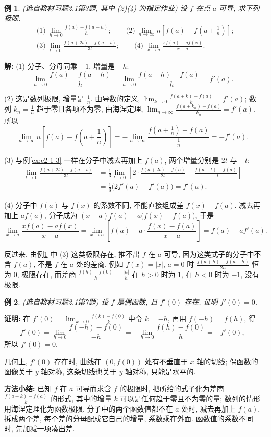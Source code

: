 \documentclass[UTF8,openany]{ctexbook}
\theoremstyle{chinesetextbook}
\newtheorem{example}{例}[section]
\newenvironment{cnproof}{\par\indent\textbf{证明:} \ignorespaces}{\par}
\newenvironment{cnsolution}{\par\indent\textbf{解:} \ignorespaces}{\par}
\begin{document}
\begin{example}\label{ex:c2-h1-3}
\textnormal{(选自教材习题2.1第3题, 其中 (2)(4) 为指定作业)} 设 $f$ 在点 $a$ 可导, 求下列极限:
\[
\begin{aligned}
&\text{(1)}\ \lim_{h\to0}\frac{f(a)-f(a-h)}h;\qquad\text{(2)}\ \lim_{n\to\infty}n\left[f(a)-f\left(a+\frac1n\right)\right];\\
&\text{(3)}\ \lim_{t\to0}\frac{f(a+2t)-f(a-t)}{3t};\qquad\text{(4)}\ \lim_{x\to a}\frac{xf(a)-af(x)}{x-a}.
\end{aligned}
\]
\end{example}
\begin{cnsolution}
(1) 分子、分母同乘 $-1$, 增量是 $-h$:
\[
\lim_{h\to0}\frac{f(a)-f(a-h)}h=\lim_{h\to0}\frac{f(a-h)-f(a)}{-h}=f'(a).
\]

(2) 这是数列极限, 增量是 $\displaystyle\frac1n$. 由导数的定义, $\displaystyle\lim_{k\to0}\frac{f(a+k)-f(a)}k=f'(a)$; 数列 $\displaystyle k_n=\frac1n$ 趋于零且各项不为零, 由海涅定理, $\displaystyle\lim_{n\to\infty}\frac{f(a+k_n)-f(a)}{k_n}=f'(a)$. 所以
\[
\lim_{n\to\infty}n\left[f(a)-f\left(a+\frac1n\right)\right]=-\lim_{n\to\infty}\frac{f\left(a+\frac1n\right)-f(a)}{\frac1n}=-f'(a).
\]

(3) 与例\ref{ex:c2-1-3} 一样在分子中减去再加上 $f(a)$, 两个增量分别是 $2t$ 与 $-t$:
\[
\begin{aligned}
\lim_{t\to0}\frac{f(a+2t)-f(a-t)}{3t}&=\frac13\lim_{t\to0}\left[2\cdot\frac{f(a+2t)-f(a)}{2t}+\frac{f(a-t)-f(a)}{-t}\right]\\
&=\frac13\bigl(2f'(a)+f'(a)\bigr)=f'(a).
\end{aligned}
\]

(4) 分子中 $f(a)$ 与 $f(x)$ 的系数不同, 不能直接组成差 $f(x)-f(a)$. 减去再加上 $af(a)$, 分子成为 $(x-a)f(a)-a\bigl(f(x)-f(a)\bigr)$, 于是
\[
\lim_{x\to a}\frac{xf(a)-af(x)}{x-a}=\lim_{x\to a}\left[f(a)-a\cdot\frac{f(x)-f(a)}{x-a}\right]=f(a)-af'(a).
\]
\end{cnsolution}
反过来, 由例\ref{ex:c2-h1-3} 中 (3) 这类极限存在, 推不出 $f$ 在 $a$ 可导, 因为这类式子的分子中不含 $f(a)$, 不是 $f$ 在 $a$ 处的差商. 例如 $f(x)=|x|$, $a=0$ 时 $\displaystyle\frac{f(a+h)-f(a-h)}{2h}$ 恒为 $0$, 极限存在, 而差商 $\displaystyle\frac{f(h)-f(0)}h=\frac{|h|}h$ 在 $h>0$ 时为 $1$, 在 $h<0$ 时为 $-1$, 没有极限.
\begin{example}\label{ex:c2-h1-7}
\textnormal{(选自教材习题2.1第7题)} 设 $f$ 是偶函数, 且 $f'(0)$ 存在. 证明 $f'(0)=0$.
\end{example}
\begin{cnproof}
在 $\displaystyle f'(0)=\lim_{k\to0}\frac{f(k)-f(0)}k$ 中令 $k=-h$, 再用 $f(-h)=f(h)$, 得
\[
f'(0)=\lim_{h\to0}\frac{f(-h)-f(0)}{-h}=-\lim_{h\to0}\frac{f(h)-f(0)}h=-f'(0),
\]
所以 $f'(0)=0$.
\end{cnproof}
几何上, $f'(0)$ 存在时, 曲线在 $(0,f(0))$ 处有不垂直于 $x$ 轴的切线; 偶函数的图像关于 $y$ 轴对称, 这条切线也关于 $y$ 轴对称, 只能是水平的.
\par\indent\textbf{方法小结:} 已知 $f$ 在 $a$ 可导而求含 $f$ 的极限时, 把所给的式子化为差商 $\displaystyle\frac{f(a+k)-f(a)}k$ 的形式, 其中的增量 $k$ 可以是任何趋于零且不为零的量; 数列的情形用海涅定理化为函数极限. 分子中的两个函数值都不在 $a$ 处时, 减去再加上 $f(a)$, 拆成两个差, 每个差的分母配成它自己的增量, 系数乘在外面. 函数值的系数不同时, 先加减一项凑出差.
\end{document}
